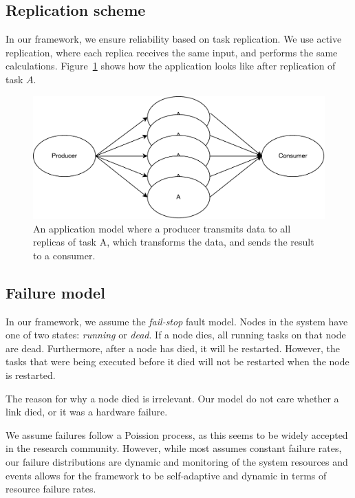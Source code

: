 \documentclass{cslthse-msc}
\begin{document}
\subsection{Replication scheme}
In our framework, we ensure reliability based on task replication. We use active replication, where each replica receives the same input, and performs the same calculations. Figure~\ref{fig:app_model_replication} shows how the application looks like after replication of task $A$.

\begin{figure}[!hbt]
\centering
\includegraphics[scale=0.5]{images/app_model_replication.pdf} 
\caption{An application model where a producer transmits data to all replicas of task A, which transforms the data, and sends the result to a consumer.}\label{fig:app_model_replication}
\end{figure}

\subsection{Failure model}
In our framework, we assume the \emph{fail-stop} fault model. Nodes in the system have one of two states: \emph{running} or \emph{dead}. If a node dies, all running tasks on that node are dead. Furthermore, after a node has died, it will be restarted. However, the tasks that were being executed before it died will not be restarted when the node is restarted.

The reason for why a node died is irrelevant. Our model do not care whether a link died, or it was a hardware failure. 

We assume failures follow a Poission process, as this seems to be widely accepted in the research community. However, while most assumes constant failure rates, our failure distributions are dynamic and monitoring of the system resources and events allows for the framework to be self-adaptive and dynamic in terms of resource failure rates.
\end{document}
